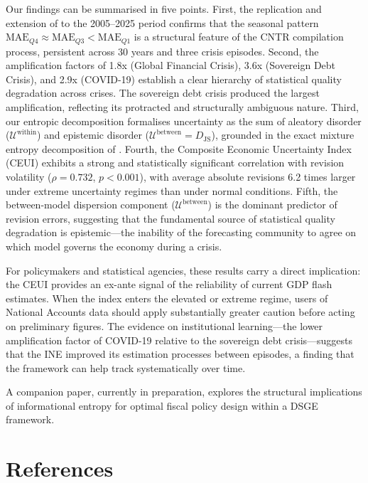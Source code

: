 \documentclass[12pt,a4paper]{article}
\theoremstyle{remark}
\begin{document}
Our findings can be summarised in five points. First, the replication and extension
of \citet{pavia2018} to the 2005--2025 period confirms that the seasonal pattern
$\text{MAE}_{Q4} \approx \text{MAE}_{Q3} < \text{MAE}_{Q1}$ is a structural feature
of the CNTR compilation process, persistent across 30 years and three crisis episodes.
Second, the amplification factors of 1.8x (Global Financial Crisis), 3.6x (Sovereign
Debt Crisis), and 2.9x (COVID-19) establish a clear hierarchy of statistical quality
degradation across crises. The sovereign debt crisis produced the largest amplification,
reflecting its protracted and structurally ambiguous nature. Third, our entropic
decomposition formalises uncertainty as the sum of aleatory disorder
($\mathcal{U}^{\text{within}}$) and epistemic disorder
($\mathcal{U}^{\text{between}} = D_{\text{JS}}$), grounded in the exact mixture
entropy decomposition of \citet{haussler1997}. Fourth, the Composite Economic
Uncertainty Index (CEUI) exhibits a strong and statistically significant correlation
with revision volatility ($\rho = 0.732$, $p < 0.001$), with average absolute revisions
6.2 times larger under extreme uncertainty regimes than under normal conditions.
Fifth, the between-model dispersion component ($\mathcal{U}^{\text{between}}$) is
the dominant predictor of revision errors, suggesting that the fundamental source of
statistical quality degradation is epistemic---the inability of the forecasting
community to agree on which model governs the economy during a crisis.

For policymakers and statistical agencies, these results carry a direct implication:
the CEUI provides an ex-ante signal of the reliability of current GDP flash estimates.
When the index enters the elevated or extreme regime, users of National Accounts data
should apply substantially greater caution before acting on preliminary figures. The
evidence on institutional learning---the lower amplification factor of COVID-19
relative to the sovereign debt crisis---suggests that the INE improved its estimation
processes between episodes, a finding that the framework can help track systematically over time.

A companion paper, currently in preparation, explores the structural implications of informational entropy for optimal fiscal policy design within a DSGE framework.


\pagebreak
\section*{References} \label{sec:references}
\renewcommand{\bibsection}{}


\end{document}
